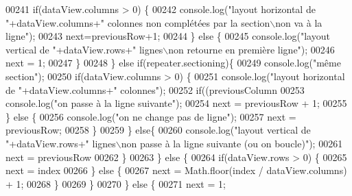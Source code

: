\begin{DoxyCode}
{00241                         \textcolor{keywordflow}{if}(dataView.columns > 0) \{
00242                             console.log(\textcolor{stringliteral}{"layout horizontal de "}+dataView.columns+\textcolor{stringliteral}{" colonnes non complétées
       par la section\(\backslash\)non va à la ligne"});
00243                             next=previousRow+1;
00244                         \} \textcolor{keywordflow}{else} \{
00245                             console.log(\textcolor{stringliteral}{"layout vertical de "}+dataView.rows+\textcolor{stringliteral}{" lignes\(\backslash\)non retourne en
       première ligne"});
00246                             next = 1;
00247                         \}
00248                     \} \textcolor{keywordflow}{else} \textcolor{keywordflow}{if}(repeater.sectioning)\{
00249                         console.log(\textcolor{stringliteral}{"même section"});
00250                         \textcolor{keywordflow}{if}(dataView.columns > 0) \{
00251                             console.log(\textcolor{stringliteral}{"layout horizontal de "}+dataView.columns+\textcolor{stringliteral}{" colonnes"});
00252                             \textcolor{keywordflow}{if}((previousColumn %
00253                                 console.log(\textcolor{stringliteral}{"on passe à la ligne suivante"});
00254                                 next = previousRow + 1;
00255                             \} \textcolor{keywordflow}{else} \{
00256                                 console.log(\textcolor{stringliteral}{"on ne change pas de ligne"});
00257                                 next = previousRow;
00258                             \}
00259                         \} \textcolor{keywordflow}{else}\{
00260                             console.log(\textcolor{stringliteral}{"layout vertical de "}+dataView.rows+\textcolor{stringliteral}{" lignes\(\backslash\)non passe à la ligne
       suivante (ou on boucle)"});
00261                             next = previousRow %
00262                         \}
00263                     \} \textcolor{keywordflow}{else} \{
00264                         \textcolor{keywordflow}{if}(dataView.rows > 0) \{
00265                             next = index %
00266                         \} \textcolor{keywordflow}{else} \{
00267                             next = Math.floor(index / dataView.columns) + 1;
00268                         \}
00269                     \}
00270                 \} \textcolor{keywordflow}{else} \{
00271                     next = 1;
}
\end{DoxyCode}
